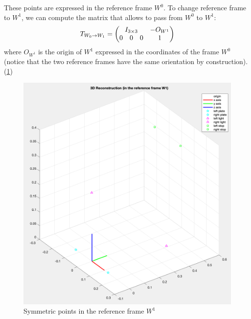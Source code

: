\documentclass{article}
\begin{document}
These points are expressed in the reference frame $W^0$. To change reference frame to $W^1$, we can compute the matrix that allows to pass from $W^0$ to $W^1$:
\begin{equation}
T_{W_0 \rightarrow W_1} = \begin{pmatrix} \multicolumn{3}{c}{I_{3 \times 3}} & -O_{W^1} \\
0 & 0 & 0 & 1
\end{pmatrix}
\end{equation}
where $O_{W^1}$ is the origin of $W^1$ expressed in the coordinates of the frame $W^0$ (notice that the two reference frames have the same orientation by construction). (\ref{fig:3dreconstructionW1})
\begin{figure}[hbt!]
\centering
\includegraphics[scale=0.45]{images/3DreconstructionW1.png}
\caption{Symmetric points in the reference frame $W^1$}
\label{fig:3dreconstructionW1}
\end{figure}

\newpage
\end{document}
